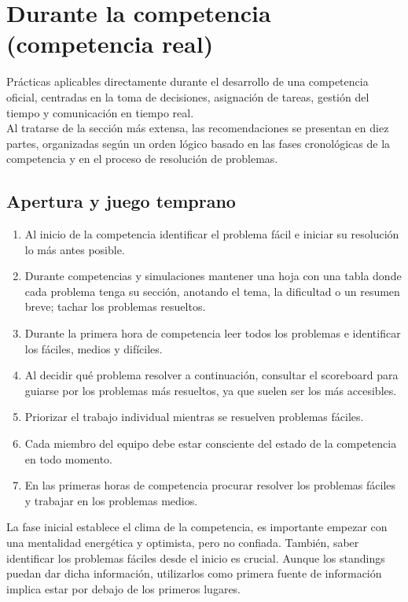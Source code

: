 \section{Durante la competencia (competencia real)}
Prácticas aplicables directamente durante el desarrollo de una competencia oficial, centradas en la toma de decisiones, asignación de tareas, gestión del tiempo y comunicación en tiempo real.\\

Al tratarse de la sección más extensa, las recomendaciones se presentan en diez partes, organizadas según un orden lógico basado en las fases cronológicas de la competencia y en el proceso de resolución de problemas.
\pagebreak
\subsection{Apertura y juego temprano}
\begin{enumerate}[resume=icpc]
    \item Al inicio de la competencia identificar el problema fácil e iniciar su resolución lo más antes posible.
    \item Durante competencias y simulaciones mantener una hoja con una tabla donde cada problema tenga su sección, anotando el tema, la dificultad o un resumen breve; tachar los problemas resueltos.
    \item Durante la primera hora de competencia leer todos los problemas e identificar los fáciles, medios y difíciles.
    \item Al decidir qué problema resolver a continuación, consultar el scoreboard para guiarse por los problemas más resueltos, ya que suelen ser los más accesibles.
    \item Priorizar el trabajo individual mientras se resuelven problemas fáciles.
    \item Cada miembro del equipo debe estar consciente del estado de la competencia en todo momento.
    \item En las primeras horas de competencia procurar resolver los problemas fáciles y trabajar en los problemas medios.
\end{enumerate}
La fase inicial establece el clima de la competencia, es importante empezar con una mentalidad energética y optimista, pero no confiada. También, saber identificar los problemas fáciles desde el inicio es crucial. Aunque los standings puedan dar dicha información, utilizarlos como primera fuente de información implica estar por debajo de los primeros lugares.\\

